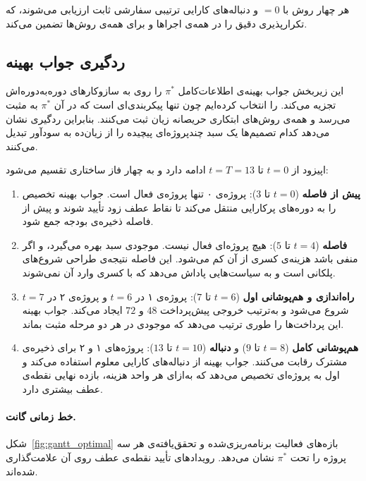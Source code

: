 هر چهار روش با  $= 0$ و دنباله‌های کارایی ترتیبی سفارشی ثابت
ارزیابی می‌شوند، که تکرارپذیری دقیق را در همه‌ی اجراها و برای همه‌ی
روش‌ها تضمین می‌کند.

\subsection{ردگیری جواب بهینه}
\label{subsec:traceback}

این زیربخش جواب بهینه‌ی اطلاعات‌کامل $\pi^*$ را روی  به
سازوکارهای دوره‌به‌دوره‌اش تجزیه می‌کند.  را انتخاب
کرده‌ایم چون تنها پیکربندی‌ای است که در آن $\pi^*$ به  مثبت
می‌رسد و همه‌ی روش‌های ابتکاری حریصانه زیان ثبت می‌کنند. بنابراین
ردگیری نشان می‌دهد کدام تصمیم‌ها یک سبد چندپروژه‌ای پیچیده را از زیان‌ده
به سودآور تبدیل می‌کنند.

اپیزود از $t = 0$ تا $t = T = 13$ ادامه دارد و به چهار فاز ساختاری
تقسیم می‌شود:

\begin{enumerate}
  \item \textbf{پیش از فاصله} ($t = 0$ تا $3$): پروژه‌ی ۰ تنها پروژه‌ی
        فعال است. جواب بهینه تخصیص را به دوره‌های پرکارایی منتقل می‌کند
        تا نقاط عطف زود تأیید شوند و پیش از فاصله ذخیره‌ی بودجه
        جمع شود.
  \item \textbf{فاصله} ($t = 4$ تا $5$): هیچ پروژه‌ای فعال نیست. موجودی
        سبد بهره می‌گیرد، و اگر منفی باشد هزینه‌ی کسری از آن کم می‌شود.
        این فاصله نتیجه‌ی طراحی شروع‌های پلکانی است و به سیاست‌هایی
        پاداش می‌دهد که با کسری وارد آن نمی‌شوند.
  \item \textbf{راه‌اندازی و هم‌پوشانی اول} ($t = 6$ تا $7$): پروژه‌ی ۱
        در $t = 6$ و پروژه‌ی ۲ در $t = 7$ شروع می‌شود و به‌ترتیب خروجی
        پیش‌پرداخت $48$ و $72$ ایجاد می‌کند. جواب بهینه این پرداخت‌ها را
        طوری ترتیب می‌دهد که موجودی در هر دو مرحله مثبت بماند.
  \item \textbf{هم‌پوشانی کامل} ($t = 8$ تا $9$) و \textbf{دنباله}
        ($t = 10$ تا $13$): پروژه‌های ۱ و ۲ برای ذخیره‌ی مشترک رقابت
        می‌کنند. جواب بهینه از دنباله‌های کارایی معلوم استفاده می‌کند و
        اول به پروژه‌ای تخصیص می‌دهد که به‌ازای هر واحد هزینه، بازده
        نهایی نقطه‌ی عطف بیشتری دارد.
\end{enumerate}

\paragraph{خط زمانی گانت.}
شکل~\ref{fig:gantt_optimal} بازه‌های فعالیت برنامه‌ریزی‌شده و
تحقق‌یافته‌ی هر سه پروژه را تحت $\pi^*$ نشان می‌دهد. رویدادهای تأیید
نقطه‌ی عطف روی آن علامت‌گذاری شده‌اند.

